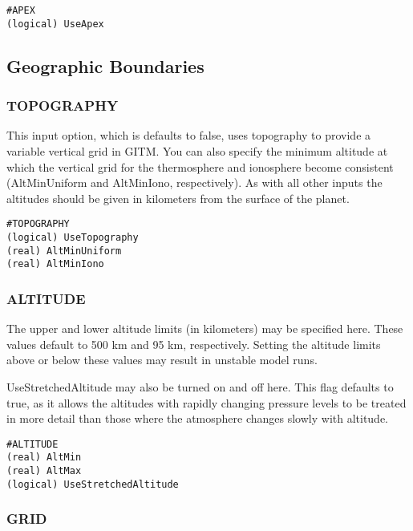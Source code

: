 \begin{verbatim}
#APEX
(logical) UseApex
\end{verbatim}


\subsection{Geographic Boundaries}
\label{geograph.sec}

\subsubsection{TOPOGRAPHY}

This input option, which is defaults to false, uses topography to provide a variable vertical grid in GITM.  You can also specify the minimum altitude at which the vertical grid for the thermosphere and ionosphere become consistent (AltMinUniform and AltMinIono, respectively).  As with all other inputs the altitudes should be given in kilometers from the surface of the planet.

\begin{verbatim}
#TOPOGRAPHY
(logical) UseTopography
(real) AltMinUniform
(real) AltMinIono
\end{verbatim}

\subsubsection{ALTITUDE}
\label{altitude.sec}

The upper and lower altitude limits (in kilometers) may be specified here.  These values default to 500 km and 95 km, respectively.  Setting the altitude limits above or below these values may result in unstable model runs.

UseStretchedAltitude may also be turned on and off here.  This flag defaults to true, as it allows the altitudes with rapidly changing pressure levels to be treated in more detail than those where the atmosphere changes slowly with altitude.

\begin{verbatim}
#ALTITUDE
(real) AltMin            
(real) AltMax             
(logical) UseStretchedAltitude
\end{verbatim}

\subsubsection{GRID}
\label{input_grid.sec}

